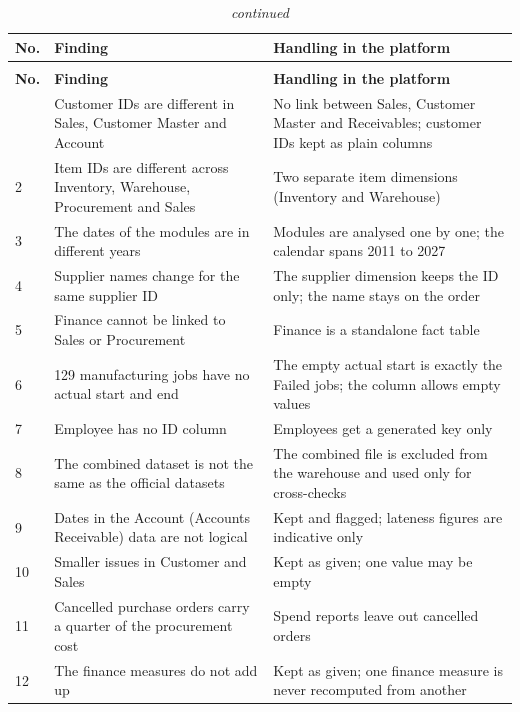 \documentclass[12pt,a4paper]{report}
\newcommand{\tabsize}{\small}
\begin{document}
\begingroup\tabsize\setlength{\tabcolsep}{4pt}
\begin{longtable}{@{}p{0.7cm}p{6.3cm}p{7.2cm}@{}}
\caption{The twelve data quality findings and how each was handled.}\label{tab:findings}\\
\toprule
\textbf{No.} & \textbf{Finding} & \textbf{Handling in the platform} \\
\midrule
\endfirsthead
\caption[]{\emph{continued}}\\
\toprule
\textbf{No.} & \textbf{Finding} & \textbf{Handling in the platform} \\
\midrule
\endhead
\bottomrule
\endfoot
\bottomrule
\endlastfoot
1 & Customer IDs are different in Sales, Customer Master and Account & No link between Sales, Customer Master and Receivables; customer IDs kept as plain columns \\
2 & Item IDs are different across Inventory, Warehouse, Procurement and Sales & Two separate item dimensions (Inventory and Warehouse) \\
3 & The dates of the modules are in different years & Modules are analysed one by one; the calendar spans 2011 to 2027 \\
4 & Supplier names change for the same supplier ID & The supplier dimension keeps the ID only; the name stays on the order \\
5 & Finance cannot be linked to Sales or Procurement & Finance is a standalone fact table \\
6 & 129 manufacturing jobs have no actual start and end & The empty actual start is exactly the Failed jobs; the column allows empty values \\
7 & Employee has no ID column & Employees get a generated key only \\
8 & The combined dataset is not the same as the official datasets & The combined file is excluded from the warehouse and used only for cross-checks \\
9 & Dates in the Account (Accounts Receivable) data are not logical & Kept and flagged; lateness figures are indicative only \\
10 & Smaller issues in Customer and Sales & Kept as given; one value may be empty \\
11 & Cancelled purchase orders carry a quarter of the procurement cost & Spend reports leave out cancelled orders \\
12 & The finance measures do not add up & Kept as given; one finance measure is never recomputed from another \\
\end{longtable}
\endgroup
\end{document}
